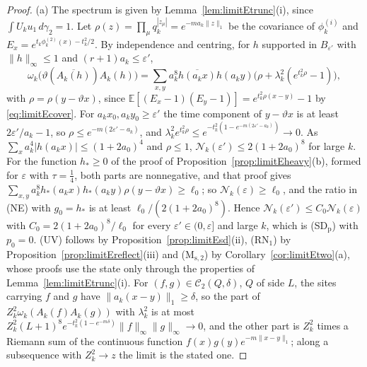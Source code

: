 \documentclass[aps,prd,twocolumn,superscriptaddress,nofootinbib,longbibliography,floatfix,amsmath,amssymb,10pt]{revtex4-2}
\theoremstyle{definition}
\theoremstyle{remark}
\newcommand{\E}{\mathbb{E}}
\begin{document}
\begin{proof}
(a) The spectrum is given by Lemma~\ref{lem:limitEtrunc}(i), since
$\int U_ku_1\,d\gamma_2=1$. Let $\rho(z)=\prod_\mu q_k^{|z_\mu|}=e^{-ma_k\|z\|_1}$ be the
covariance of $\phi^{(i)}_k$ and $E_x=e^{t_k\phi^{(2)}_k(x)-t_k^2/2}$. By
independence and centring, for $h$ supported in $B_{\varepsilon'}$ with
$\|h\|_\infty\le1$ and $(r+1)a_k\le\varepsilon'$,
\[
\omega_k\bigl(\vartheta(\overline{A_k(h)})A_k(h)\bigr)=\sum_{x,y}a_k^8
\overline{h(a_kx)}h(a_ky)\bigl(\rho+\lambda_k^2(e^{t_k^2\rho}-1)\bigr),
\]
with $\rho=\rho(y-\vartheta x)$, since $\E[(E_x-1)(E_y-1)]=e^{t_k^2\rho(x-y)}-1$
by \eqref{eq:limitEcover}. For $a_kx_0,a_ky_0\ge\varepsilon'$ the time
component of $y-\vartheta x$ is at least $2\varepsilon'/a_k-1$, so
$\rho\le e^{-m(2\varepsilon'-a_k)}$, and $\lambda_k^2e^{t_k^2\rho}\le
e^{-t_k^2(1-e^{-m(2\varepsilon'-a_k)})}\to0$. As $\sum_xa_k^4|h(a_kx)|\le
(1+2a_0)^4$ and $\rho\le1$, $\mathcal N_k(\varepsilon')\le2(1+2a_0)^8$ for
large $k$. For the function $h_*\ge0$ of the proof of
Proposition~\ref{prop:limitEheavy}(b), formed for $\varepsilon$ with
$\tau=\frac14$, both parts are nonnegative, and that proof gives
$\sum_{x,y}a_k^8h_*(a_kx)h_*(a_ky)\rho(y-\vartheta x)\ge\ell_0$; so
$\mathcal N_k(\varepsilon)\ge\ell_0$, and the ratio in (NE) with $g_0=h_*$
is at least $\ell_0/(2(1+2a_0)^8)$. Hence $\mathcal N_k(\varepsilon')\le C_0\mathcal
N_k(\varepsilon)$ with $C_0=2(1+2a_0)^8/\ell_0$ for every $\varepsilon'\in
(0,\varepsilon]$ and large $k$, which is (SD$_{\mathrm p}$) with $p_0=0$.
(UV) follows by Proposition~\ref{prop:limitEsd}(ii), (RN$_1$) by
Proposition~\ref{prop:limitEreflect}(iii) and (M$_{\mathrm s,2}$) by
Corollary~\ref{cor:limitEtwo}(a), whose proofs use the state only through
the properties of Lemma~\ref{lem:limitEtrunc}(i). For $(f,g)\in\mathcal
C_2(Q,\delta)$, $Q$ of side $L$, the sites carrying $f$ and $g$ have
$\|a_k(x-y)\|_1\ge\delta$, so the part of $Z_k^2\omega_k(A_k(f)A_k(g))$ with
$\lambda_k^2$ is at most $Z_k^2(L+1)^8e^{-t_k^2(1-e^{-m\delta})}\|f\|_\infty
\|g\|_\infty\to0$, and the other part is $Z_k^2$ times a Riemann sum of the
continuous function $f(x)g(y)e^{-m\|x-y\|_1}$; along a subsequence with
$Z_k^2\to z$ the limit is the stated one.


\end{proof}
\end{document}
